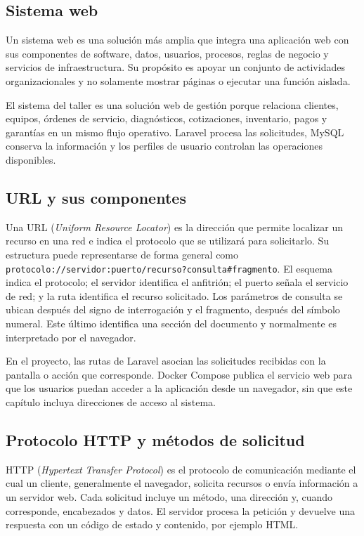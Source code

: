 \subsection{Sistema web}

Un sistema web es una solución más amplia que integra una aplicación web con sus componentes de software, datos, usuarios, procesos, reglas de negocio y servicios de infraestructura. Su propósito es apoyar un conjunto de actividades organizacionales y no solamente mostrar páginas o ejecutar una función aislada.

El sistema del taller es una solución web de gestión porque relaciona clientes, equipos, órdenes de servicio, diagnósticos, cotizaciones, inventario, pagos y garantías en un mismo flujo operativo. Laravel procesa las solicitudes, MySQL conserva la información y los perfiles de usuario controlan las operaciones disponibles.

\subsection{URL y sus componentes}

Una URL (\textit{Uniform Resource Locator}) es la dirección que permite localizar un recurso en una red e indica el protocolo que se utilizará para solicitarlo. Su estructura puede representarse de forma general como \texttt{protocolo://servidor:puerto/recurso?consulta\#fragmento}. El esquema indica el protocolo; el servidor identifica el anfitrión; el puerto señala el servicio de red; y la ruta identifica el recurso solicitado. Los parámetros de consulta se ubican después del signo de interrogación y el fragmento, después del símbolo numeral. Este último identifica una sección del documento y normalmente es interpretado por el navegador.

En el proyecto, las rutas de Laravel asocian las solicitudes recibidas con la pantalla o acción que corresponde. Docker Compose publica el servicio web para que los usuarios puedan acceder a la aplicación desde un navegador, sin que este capítulo incluya direcciones de acceso al sistema.

\subsection{Protocolo HTTP y métodos de solicitud}

HTTP (\textit{Hypertext Transfer Protocol}) es el protocolo de comunicación mediante el cual un cliente, generalmente el navegador, solicita recursos o envía información a un servidor web. Cada solicitud incluye un método, una dirección y, cuando corresponde, encabezados y datos. El servidor procesa la petición y devuelve una respuesta con un código de estado y contenido, por ejemplo HTML.

